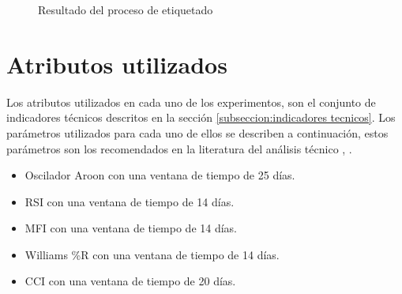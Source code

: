 \documentclass[12pt]{report}
\theoremstyle{break}
\theoremstyle{break}
\begin{document}
\begin{figure}[ht]
\centering
{}
\caption{\label{imagen:etiquetado} Resultado del proceso de etiquetado}
\end{figure}

\section{Atributos utilizados}
\label{seccion:atributos}
Los atributos utilizados en cada uno de los experimentos, son el conjunto de indicadores técnicos descritos en la sección \ref{subseccion:indicadores tecnicos}. Los parámetros utilizados para cada uno de ellos se describen a continuación, estos parámetros son los recomendados en la literatura del análisis técnico \cite{encycoplediaTechnicalIndicators}, \cite{technicalAnalysisKirkPatrick}.


\begin{itemize}
\item Oscilador Aroon con una ventana de tiempo de 25 días.

\item RSI con una ventana de tiempo de 14 días.

\item MFI con una ventana de tiempo de 14 días.

\item Williams \%R con una ventana de tiempo de 14 días.

\item CCI con una ventana de tiempo de 20 días.
\end{itemize}
\end{document}

